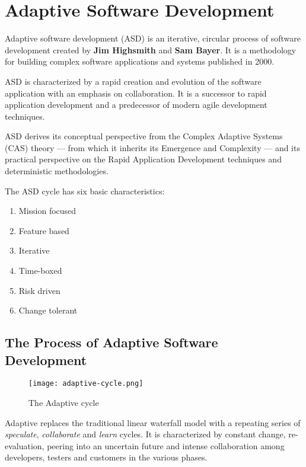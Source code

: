 \documentclass[main.tex]{subfiles}
\begin{document}
\section{Adaptive Software Development}

Adaptive software development (ASD) is an iterative, circular process of software development created by \textbf{Jim Highsmith} and \textbf{Sam Bayer}. It is a methodology for building complex software applications and systems published in 2000.

ASD is characterized by a rapid creation and evolution of the software application with an emphasis on collaboration. It is a successor to rapid application development and a predecessor of modern agile development techniques.\supercite{adaptive-wikidot,adaptive-wikipedia}

ASD derives its conceptual perspective from the Complex Adaptive Systems (CAS) theory --- from which it inherits its Emergence and Complexity --- and its practical perspective on the Rapid Application Development techniques and deterministic methodologies.

The ASD cycle has six basic characteristics:\supercite{adaptive-ecosystems}
\begin{enumerate}
	\item Mission focused
	\item Feature based
	\item Iterative
	\item Time-boxed
	\item Risk driven
	\item Change tolerant
\end{enumerate}

\subsection{The Process of Adaptive Software Development}

\begin{wrapfigure}[16]{l}[2em]{0.6\textwidth}
	\vspace*{-\baselineskip}
	\texttt{[image: adaptive-cycle.png]}
	\caption{The Adaptive cycle\label{fig:adaptive-cycle}}
\end{wrapfigure}

Adaptive replaces the traditional linear waterfall model with a repeating series of \emph{speculate}, \emph{collaborate} and \emph{learn} cycles.
It is characterized by constant change, re-evaluation, peering into an uncertain future and intense collaboration among developers, testers and customers in the various phases.
\end{document}
